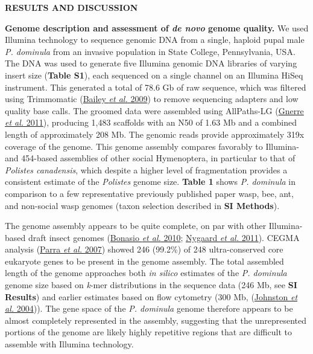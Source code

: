 \documentclass[]{article}
\begin{document}
\textbf{RESULTS AND DISCUSSION}

\textbf{Genome description and assessment of \emph{de novo} genome
quality.} We used Illumina technology to sequence genomic DNA from a
single, haploid pupal male \emph{P. dominula} from an invasive
population in State College, Pennsylvania, USA. The DNA was used to
generate five Illumina genomic DNA libraries of varying insert size
(\textbf{Table S1}), each sequenced on a single channel on an Illumina
HiSeq instrument. This generated a total of 78.6 Gb of raw sequence,
which was filtered using Trimmomatic
(\protect\hyperlink{ux5fENREFux5f1}{Bailey \emph{et al.} 2009}) to
remove sequencing adapters and low quality base calls. The groomed data
were assembled using AllPaths-LG
(\protect\hyperlink{ux5fENREFux5f14}{Gnerre \emph{et al.} 2011}),
producing 1,483 scaffolds with an N50 of 1.63 Mb and a combined length
of approximately 208 Mb. The genomic reads provide approximately 319x
coverage of the genome. This genome assembly compares favorably to
Illumina- and 454-based assemblies of other social Hymenoptera, in
particular to that of \emph{Polistes canadensis}, which despite a higher
level of fragmentation provides a consistent estimate of the
\emph{Polistes} genome size. \textbf{Table 1} shows \emph{P. dominula}
in comparison to a few representative previously published paper wasp,
bee, ant, and non-social wasp genomes (taxon selection described in
\textbf{SI Methods}).

The genome assembly appears to be quite complete, on par with other
Illumina-based draft insect genomes
(\protect\hyperlink{ux5fENREFux5f5}{Bonasio \emph{et al.} 2010};
\protect\hyperlink{ux5fENREFux5f37}{Nygaard \emph{et al.} 2011}). CEGMA
analysis (\protect\hyperlink{ux5fENREFux5f42}{Parra \emph{et al.} 2007})
showed 246 (99.2\%) of 248 ultra-conserved core eukaryote genes to be
present in the genome assembly. The total assembled length of the genome
approaches both \emph{in silico} estimates of the \emph{P. dominula}
genome size based on \emph{k}-mer distributions in the sequence data
(246 Mb, see \textbf{SI Results}) and earlier estimates based on flow
cytometry (300 Mb, (\protect\hyperlink{ux5fENREFux5f23}{Johnston
\emph{et al.} 2004})). The gene space of the \emph{P. dominula} genome
therefore appears to be almost completely represented in the assembly,
suggesting that the unrepresented portions of the genome are likely
highly repetitive regions that are difficult to assemble with Illumina
technology.
\end{document}
